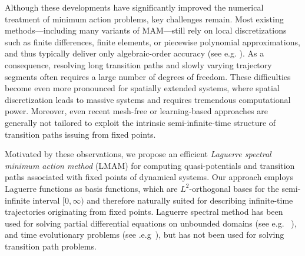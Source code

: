 \documentclass[a4paper,fleqn, 12pt]{cas-sc}
\numberwithin{table}{section}
\begin{document}
Although these developments have significantly improved the numerical treatment of minimum action problems, key challenges remain. 
Most existing methods---including many variants of MAM---still rely on local discretizations such as finite differences, finite elements, or piecewise polynomial approximations, and thus typically deliver only algebraic-order accuracy (see e.g. \cite{wan_convergence_2018,hong2025convergence}). 
As a consequence, resolving long transition paths and slowly varying trajectory segments often requires a large number of degrees of freedom. 
These difficulties become even more pronounced for spatially extended systems, where spatial discretization leads to massive systems and requires tremendous computational power. 
Moreover, even recent mesh-free or learning-based approaches are generally not tailored to exploit the intrinsic semi-infinite-time structure of transition paths issuing from fixed points. 


Motivated by these observations, we propose an efficient \emph{Laguerre spectral minimum action method} (LMAM) for computing quasi-potentials and transition paths associated with fixed points of dynamical systems. Our approach employs Laguerre functions as basis functions, which are $L^2$-orthogonal bases for the semi-infinite interval $[0,\infty)$ and therefore naturally suited for describing infinite-time trajectories originating from fixed points. Laguerre spectral method has been used for solving partial differential equations on unbounded domains (see e.g.~\cite{Mavriplis1989LaguerrePolynomials, CoulaFK1990LaguerreSpectral,GuoShen2000LaguerreGalerkinMethod, Shen2000StableEfficient,BoydRB2003PseudospectralMethods, BaoShen2005FourthorderTimesplitting,AzaieSXZ2009LaguerreLegendre,ShenWangYu2016EfficientSpectralelement} ), and time evolutionary problems (see .e.g~\cite{Wahlberg1991SystemIdentification, Mikha1999SpectralLaguerre,Ben-yZ2007NumericalIntegration,GuoWTW2008IntegrationProcesses}), but has not been used for solving transition path problems.
\end{document}
